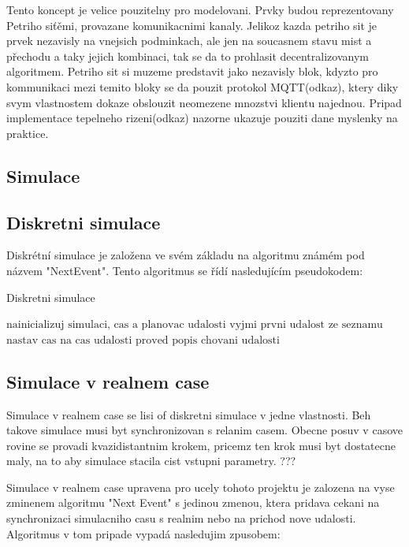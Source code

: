 Tento koncept je velice pouzitelny pro modelovani. Prvky budou reprezentovany Petriho siťěmi, provazane komunikacnimi kanaly. Jelikoz kazda petriho sit je prvek nezavisly na vnejsich podminkach, ale jen na soucasnem stavu mist a přechodu a taky jejich kombinaci, tak se da to prohlasit decentralizovanym algoritmem. Petriho sit si muzeme predstavit jako nezavisly blok, kdyzto pro kommunikaci mezi temito bloky se da pouzit protokol MQTT(odkaz), ktery diky svym vlastnostem dokaze obslouzit neomezene mnozstvi klientu najednou. Pripad implementace tepelneho rizeni(odkaz) nazorne ukazuje pouziti dane myslenky na praktice.
\subsection{Simulace}
\subsection{Diskretni simulace}
Diskrétní simulace je založena ve svém základu na algoritmu známém pod názvem "NextEvent". Tento algoritmus se řídí nasledujícím pseudokodem:
\begin{algorithm}
  \caption{Diskretni simulace}\label{euclid}
  \begin{algorithmic}[1]
  \State $\text{nainicializuj simulaci, cas a planovac udalosti}$
  \State $\text{vyjmi prvni udalost ze seznamu}$
  \Return
  \EndIf
  \State $\text{nastav cas na cas udalosti}$
  \State $\text{proved popis chovani udalosti}$
  \EndWhile
  \end{algorithmic}
  \end{algorithm}
\subsection{Simulace v realnem case}
Simulace v realnem case se lisi of diskretni simulace v jedne vlastnosti. Beh takove simulace musi byt synchronizovan s relanim casem. Obecne posuv v casove rovine se provadi kvazidistantnim krokem, pricemz ten krok musi byt dostatecne maly, na to aby simulace stacila cist vstupni parametry. ??? %

Simulace v realnem case upravena pro ucely tohoto projektu je zalozena na vyse zminenem algoritmu "Next Event" s jedinou zmenou, ktera pridava cekani na synchronizaci simulacniho casu s realnim nebo na prichod nove udalosti. Algoritmus v tom pripade vypadá nasledujim zpusobem:

